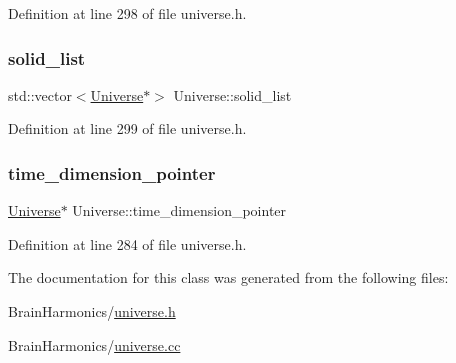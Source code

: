 Definition at line 298 of file universe.\+h.

\mbox{\label{class_universe_a747f9d3cf0b2caada4461cb7b12ea17b}} 
\subsubsection{\texorpdfstring{solid\+\_\+list}{solid\_list}}
{\footnotesize\ttfamily std\+::vector$<$\mbox{\hyperlink{class_universe}{Universe}}$\ast$$>$ Universe\+::solid\+\_\+list\hspace{0.3cm}{\ttfamily [protected]}}



Definition at line 299 of file universe.\+h.

\mbox{\label{class_universe_a3ce4365c727cb6eb5b650146a4188b9b}} 
\subsubsection{\texorpdfstring{time\+\_\+dimension\+\_\+pointer}{time\_dimension\_pointer}}
{\footnotesize\ttfamily \mbox{\hyperlink{class_universe}{Universe}}$\ast$ Universe\+::time\+\_\+dimension\+\_\+pointer}



Definition at line 284 of file universe.\+h.



The documentation for this class was generated from the following files\+:\begin{DoxyCompactItemize}
\item 
Brain\+Harmonics/\mbox{\hyperlink{universe_8h}{universe.\+h}}\item 
Brain\+Harmonics/\mbox{\hyperlink{universe_8cc}{universe.\+cc}}\end{DoxyCompactItemize}
